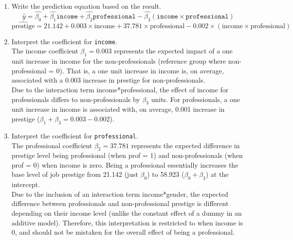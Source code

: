 \documentclass[12pt,letterpaper]{article}
\begin{document}
\begin{enumerate}
	\newpage
	\vspace{0.5cm}
	\item [(c)]
	Write the prediction equation based on the result.
	\begin{equation}
		\hat{y} = \hat{\beta_0} + \hat{\beta_1}\texttt{income} + \hat{\beta_2}\texttt{professional} - \hat{\beta_3}(\texttt{income}\times \texttt{professional})
	\end{equation}
	\begin{equation}
		\widehat{\text{prestige}} = 21.142 + 0.003\times\text{income} + 37.781\times\text{professional} - 0.002\times(\text{income}\times \text{professional})
	\end{equation}
	
	\vspace*{1cm}
	\item [(d)]
	Interpret the coefficient for \texttt{income}. \\
	
	The income coefficient $\beta_1 = 0.003$ represents the expected impact of a one unit increase in income for the non-professionals (reference group where non-professional = 0). That is,  a one unit increase in income is, on average, associated with a 0.003 increase in prestige for non-professionals. \\
	
	Due to the interaction term income*professional, the effect of income for professionals differs to non-professionals by $\beta_3$ units. For professionals, a one unit increase in income is associated with, on average, 0.001 increase in prestige ($\beta_1 + \beta_3 = 0.003-0.002$). 
	
	
	\vspace{2cm}
	\item [(e)]
	Interpret the coefficient for \texttt{professional}.\\
	
	The professional coefficient $\beta_2 = 37.781$ represents the expected difference in prestige level being professional (when prof = 1) and non-professionals (when prof = 0) when income is zero. Being a professional essentially increases the base level of job prestige from 21.142 (just $\beta_0$) to 58.923 ($\beta_0 + \beta_3$) at the intercept.  \\
	
 	Due to the inclusion of an interaction term income*gender, the expected difference between professionals and non-professional prestige is different depending on their income level (unlike the constant effect of a dummy in an additive model).  Therefore, this interpretation is restricted to when income is 0, and should not be mistaken for the overall effect of being a professional.  
	

\end{enumerate}
\end{document}
